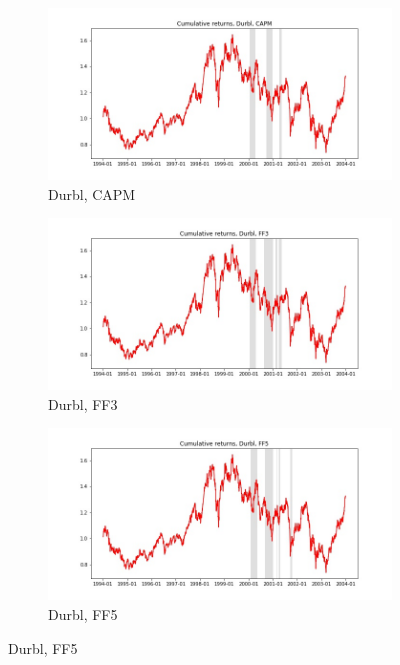 \documentclass{article}
\begin{document}
\begin{figure}
\centering
  \begin{subfigure}[b]{0.3\textwidth}
    \includegraphics[width=\textwidth]{Durbl/bwunif_full_cumrets_ofint_CAPM.jpg}
    \caption{Durbl, CAPM}
    \label{fig:1}
  \end{subfigure}
  \begin{subfigure}[b]{0.3\textwidth}
    \includegraphics[width=\textwidth]{Durbl/bwunif_full_cumrets_ofint_FF3.jpg}
    \caption{Durbl, FF3}
    \label{fig:2}
  \end{subfigure}
   \begin{subfigure}[b]{0.3\textwidth}
    \includegraphics[width=\textwidth]{Durbl/bwunif_full_cumrets_ofint_FF5.jpg}
    \caption{Durbl, FF5}
    \label{fig:2}
  \end{subfigure}
  \end{figure}
 
\end{document}
